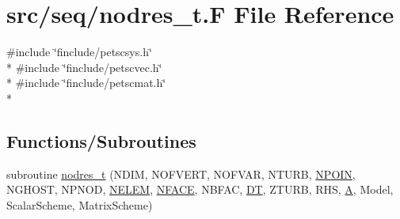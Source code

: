 \hypertarget{seq_2nodres__t_8_f}{\section{src/seq/nodres\-\_\-t.F File Reference}
\label{seq_2nodres__t_8_f}
}
{\ttfamily \#include \char`\"{}finclude/petscsys.\-h\char`\"{}}\\*
{\ttfamily \#include \char`\"{}finclude/petscvec.\-h\char`\"{}}\\*
{\ttfamily \#include \char`\"{}finclude/petscmat.\-h\char`\"{}}\\*
\subsection*{Functions/\-Subroutines}
\begin{DoxyCompactItemize}
\item 
subroutine \hyperlink{seq_2nodres__t_8_f_a44983e2bd13c55243a30a2d9eacd661d}{nodres\-\_\-t} (N\-D\-I\-M, N\-O\-F\-V\-E\-R\-T, N\-O\-F\-V\-A\-R, N\-T\-U\-R\-B, \hyperlink{mesh_8com_ae28c1572321efcd8715b974d87d20c58}{N\-P\-O\-I\-N}, N\-G\-H\-O\-S\-T, N\-P\-N\-O\-D, \hyperlink{mesh_8com_aee5e75b79d0e815c0603cfbccc618957}{N\-E\-L\-E\-M}, \hyperlink{mesh_8com_a78142d59d4cbb9fedbede16187658dd3}{N\-F\-A\-C\-E}, N\-B\-F\-A\-C, \hyperlink{myts_8com_a41549d5ede5e2b840495daf35608da41}{D\-T}, Z\-T\-U\-R\-B, R\-H\-S, \hyperlink{ibc2_8com_ad2108d58343608772fff791c23da58f5}{A}, Model, Scalar\-Scheme, Matrix\-Scheme)
\end{DoxyCompactItemize}


